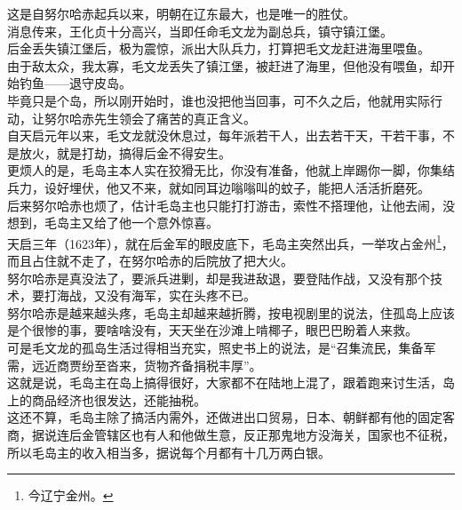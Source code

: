 \begin{multicols}{\theparacolNo}
这是自努尔哈赤起兵以来，明朝在辽东最大，也是唯一的胜仗。\\

消息传来，王化贞十分高兴，当即任命毛文龙为副总兵，镇守镇江堡。\\

后金丢失镇江堡后，极为震惊，派出大队兵力，打算把毛文龙赶进海里喂鱼。\\

由于敌太众，我太寡，毛文龙丢失了镇江堡，被赶进了海里，但他没有喂鱼，却开始钓鱼——退守皮岛。\\

毕竟只是个岛，所以刚开始时，谁也没把他当回事，可不久之后，他就用实际行动，让努尔哈赤先生领会了痛苦的真正含义。\\

自天启元年以来，毛文龙就没休息过，每年派若干人，出去若干天，干若干事，不是放火，就是打劫，搞得后金不得安生。\\

更烦人的是，毛岛主本人实在狡猾无比，你没有准备，他就上岸踢你一脚，你集结兵力，设好埋伏，他又不来，就如同耳边嗡嗡叫的蚊子，能把人活活折磨死。\\

后来努尔哈赤也烦了，估计毛岛主也只能打打游击，索性不搭理他，让他去闹，没想到，毛岛主又给了他一个意外惊喜。\\

天启三年（1623年），就在后金军的眼皮底下，毛岛主突然出兵，一举攻占金州\footnote{今辽宁金州。}，而且占住就不走了，在努尔哈赤的后院放了把大火。\\

努尔哈赤是真没法了，要派兵进剿，却是我进敌退，要登陆作战，又没有那个技术，要打海战，又没有海军，实在头疼不已。\\

努尔哈赤是越来越头疼，毛岛主却越来越折腾，按电视剧里的说法，住孤岛上应该是个很惨的事，要啥啥没有，天天坐在沙滩上啃椰子，眼巴巴盼着人来救。\\

可是毛文龙的孤岛生活过得相当充实，照史书上的说法，是“召集流民，集备军需，远近商贾纷至沓来，货物齐备捐税丰厚”。\\

这就是说，毛岛主在岛上搞得很好，大家都不在陆地上混了，跟着跑来讨生活，岛上的商品经济也很发达，还能抽税。\\

这还不算，毛岛主除了搞活内需外，还做进出口贸易，日本、朝鲜都有他的固定客商，据说连后金管辖区也有人和他做生意，反正那鬼地方没海关，国家也不征税，所以毛岛主的收入相当多，据说每个月都有十几万两白银。\\


\end{multicols}
